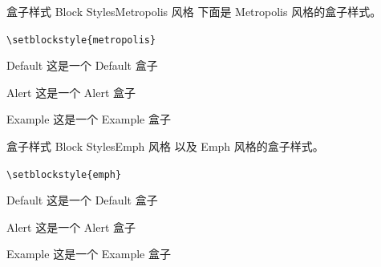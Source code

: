 \documentclass[10pt,aspectratio=169,fontset=none]{ctexbeamer}
\begin{document}
    \begin{frame}{盒子样式 Block Styles}{Metropolis 风格}
    下面是 Metropolis 风格的盒子样式。    

        \begin{center}
            \texttt{\textcolor{primary}{\textbackslash setblockstyle}\{metropolis\}}
        \end{center}

        \centering
        \begin{minipage}[b]{0.5\textwidth}
            \begin{block}{Default}
                这是一个 Default 盒子
            \end{block}
            \begin{alertblock}{Alert}
                这是一个 Alert 盒子
            \end{alertblock}
            \begin{exampleblock}{Example}
                这是一个 Example 盒子
            \end{exampleblock}       
        \end{minipage}

    \end{frame}

    \begin{frame}{盒子样式 Block Styles}{Emph 风格}
    以及 Emph 风格的盒子样式。   

        \begin{center}
            \texttt{\textcolor{primary}{\textbackslash setblockstyle}\{emph\}}
        \end{center}

        \centering
        \begin{minipage}[b]{0.5\textwidth}
            \begin{block}{Default}
                这是一个 Default 盒子
            \end{block}
            \begin{alertblock}{Alert}
                这是一个 Alert 盒子
            \end{alertblock}
            \begin{exampleblock}{Example}
                这是一个 Example 盒子
            \end{exampleblock}       
        \end{minipage}
    \end{frame}
\end{document}
